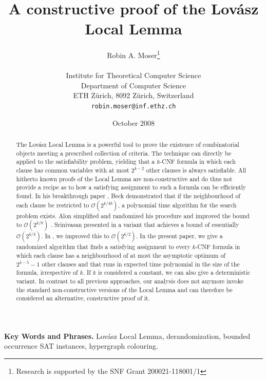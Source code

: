 \documentclass[11pt,a4paper]{article}
\begin{document}
\title{A constructive proof of the Lov\'asz Local Lemma}
\author{Robin A. Moser\thanks{Research is
   supported by the SNF Grant 200021-118001/1}
\\ \vspace{0.1cm} \\
Institute for Theoretical Computer Science\\
Department of Computer Science\\
ETH Z\"urich, 8092 Z\"urich, Switzerland\\
\texttt{robin.moser@inf.ethz.ch}
}
\date{October 2008}
\maketitle

\begin{abstract} 
The Lov\'asz Local Lemma \cite{EL75} is a powerful tool to prove the existence of combinatorial objects meeting
a prescribed collection of criteria. The technique can directly be applied to the satisfiability problem, 
yielding that a $k$-CNF formula in which each clause has common variables with at most $2^{k-2}$ other clauses is 
always satisfiable. All hitherto known proofs of the Local Lemma are non-constructive and do thus not provide a recipe
as to how a satisfying assignment to such a formula can be efficiently found. In his breakthrough paper \cite{Bec91}, Beck
demonstrated that if the neighbourhood of each clause be restricted to $\mathcal{O}(2^{k/48})$, a polynomial time algorithm for
the search problem exists. Alon simplified and randomized his procedure and improved the bound to $\mathcal{O}(2^{k/8})$ \cite{Alo91}. 
Srinivasan presented in \cite{Sri08} a variant that achieves a bound of essentially $\mathcal{O}(2^{k/4})$. In \cite{Mos08}, we 
improved this to $\mathcal{O}(2^{k/2})$. In the present paper, we give a randomized algorithm that finds a satisfying assignment to 
every $k$-CNF formula in which each clause has a neighbourhood of at most the asymptotic optimum of $2^{k-5}-1$ other clauses and
that runs in expected time polynomial in the
size of the formula, irrespective of $k$. If $k$ is considered a constant, we can also give a deterministic variant.
In contrast to all previous approaches, our analysis does not anymore invoke the standard non-constructive versions of the
Local Lemma and can therefore be considered an alternative, constructive proof of it.
\end{abstract}

\smallskip
\noindent \textbf{Key Words and Phrases.} Lov\'asz Local Lemma,
derandomization, bounded occurrence SAT instances, hypergraph colouring.
\end{document}
